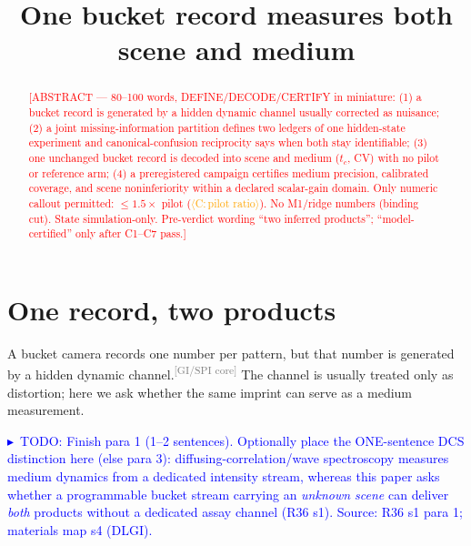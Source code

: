 \documentclass[10pt,twocolumn]{article}
\title{One bucket record measures both scene and medium}
\author{\SPH{author block --- USER DECISION (gap G7)}}
\date{}
\newcommand{\SPH}[1]{\textcolor{red}{[#1]}}
\newcommand{\CAMPAIGN}[1]{\textcolor{orange}{$\langle$C:\,#1$\rangle$}}
\newcommand{\TODOc}[1]{\par\smallskip\noindent\textcolor{blue}{\footnotesize$\blacktriangleright$~TODO: #1}\par\smallskip}
\newcommand{\CITE}[1]{\textsuperscript{\textcolor{gray}{\scriptsize[#1]}}}
\newcommand{\tc}{t_{c}}
\begin{document}
\maketitle

\begin{abstract}
\SPH{ABSTRACT --- 80--100 words, DEFINE/DECODE/CERTIFY in miniature:
(1) a bucket record is generated by a hidden dynamic channel usually corrected as
nuisance; (2) a joint missing-information partition defines two ledgers of one
hidden-state experiment and canonical-confusion reciprocity says when both stay
identifiable; (3) one unchanged bucket record is decoded into scene and medium
($\tc$, CV) with no pilot or reference arm; (4) a preregistered campaign certifies
medium precision, calibrated coverage, and scene noninferiority within a declared
scalar-gain domain. Only numeric callout permitted: $\le 1.5\times$ pilot
(\CAMPAIGN{pilot ratio}). No M1/ridge numbers (binding cut). State simulation-only.
Pre-verdict wording ``two inferred products''; ``model-certified'' only after
C1--C7 pass.}
\end{abstract}

\section{One record, two products}
\label{sec:intro}

A bucket camera records one number per pattern, but that number is generated by a
hidden dynamic channel.\CITE{GI/SPI core}
The channel is usually treated only as distortion; here we ask whether the same
imprint can serve as a medium measurement.
\TODOc{Finish para 1 (1--2 sentences). Optionally place the ONE-sentence DCS
distinction here (else para 3): diffusing-correlation/wave spectroscopy measures
medium dynamics from a dedicated intensity stream, whereas this paper asks whether
a programmable bucket stream carrying an \emph{unknown scene} can deliver
\emph{both} products without a dedicated assay channel (R36 s1). Source: R36 s1
para 1; materials map s4 (DLGI).}
\end{document}
